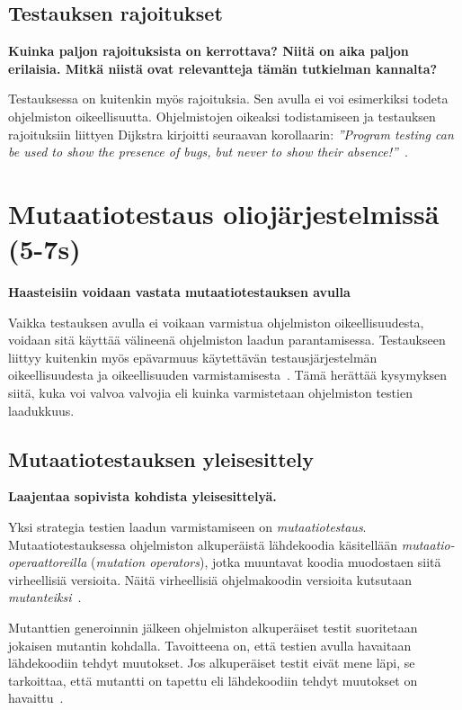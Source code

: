 \documentclass[finnish, grading]{tktltiki2}
\theoremstyle{definition}
\theoremstyle{remark}
\begin{document}
\subsection{Testauksen rajoitukset}

\textbf{Kuinka paljon rajoituksista on kerrottava? Niitä on aika paljon erilaisia. Mitkä niistä ovat relevantteja tämän tutkielman kannalta?}

Testauksessa on kuitenkin myös rajoituksia. Sen avulla ei voi esimerkiksi todeta ohjelmiston oikeellisuutta. Ohjelmistojen oikeaksi todistamiseen ja testauksen rajoituksiin liittyen Dijkstra kirjoitti seuraavan korollaarin: \textit{''Program testing can be used to show the presence of bugs, but never to show their absence!''}~\cite[s. 6]{Dahl:Dijkstra:Hoare:1972}. 

\section{Mutaatiotestaus oliojärjestelmissä (5-7s)}

\textbf{Haasteisiin voidaan vastata mutaatiotestauksen avulla}

Vaikka testauksen avulla ei voikaan varmistua ohjelmiston oikeellisuudesta, voidaan sitä käyttää välineenä ohjelmiston laadun parantamisessa. Testaukseen liittyy kuitenkin myös epävarmuus käytettävän testausjärjestelmän oikeellisuudesta ja oikeellisuuden varmistamisesta~\cite[s. 209]{Manna:Waldinger:1978}. Tämä herättää kysymyksen siitä, kuka voi valvoa valvojia eli kuinka varmistetaan ohjelmiston testien laadukkuus.

\subsection{Mutaatiotestauksen yleisesittely}

\textbf{Laajentaa sopivista kohdista yleisesittelyä.}

Yksi strategia testien laadun varmistamiseen on \textit{mutaatiotestaus}. Mutaatiotestauksessa ohjelmiston alkuperäistä lähdekoodia käsitellään \textit{mutaatio-operaattoreilla} (\textit{mutation operators}), jotka muuntavat koodia muodostaen siitä virheellisiä versioita. Näitä virheellisiä ohjelmakoodin versioita kutsutaan \textit{mutanteiksi}~\cite[s. 869]{Ma:Harrold:Kwon:2006}. 

Mutanttien generoinnin jälkeen ohjelmiston alkuperäiset testit suoritetaan jokaisen mutantin kohdalla. Tavoitteena on, että testien avulla havaitaan lähdekoodiin tehdyt muutokset. Jos alkuperäiset testit eivät mene läpi, se tarkoittaa, että mutantti on tapettu eli lähdekoodiin tehdyt muutokset on havaittu~\cite[s. 9]{Kim:Clark:McDermid:2000}. 
\end{document}
